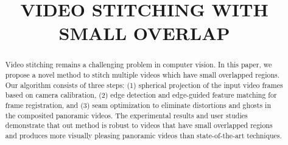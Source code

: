 \documentclass[conference]{IEEEtran}
\begin{document}
\title{VIDEO STITCHING WITH SMALL OVERLAP\\
}

\author{
}

\maketitle

\begin{abstract}
Video stitching remains a challenging problem in computer vision. In this paper, we propose a novel method to stitch multiple videos which have small overlapped regions.
Our algorithm consists of three steps: (1) spherical projection of the input video frames based on camera calibration, (2) edge detection and edge-guided feature matching for frame registration, and (3) seam optimization to eliminate distortions and ghosts in the composited panoramic videos. 
%
The experimental results and user studies 
demonstrate that out method is robust to videos that have small overlapped regions and produces more visually pleasing panoramic videos than state-of-the-art techniques.
\end{abstract}
\end{document}
